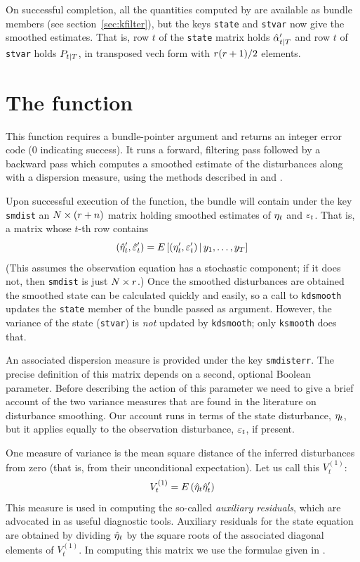 On successful completion, all the quantities computed by
 are available as bundle members (see
section~\ref{sec:kfilter}), but the keys \texttt{state} and
\texttt{stvar} now give the smoothed estimates.  That is, row $t$ of
the \texttt{state} matrix holds $\hat{\alpha}_{t|T}'$ and row $t$
of \texttt{stvar} holds $P_{t|T}$, in transposed vech form
with $r(r +1)/2$ elements.

\section{The  function}
\label{sec:kdsmooth}

This function requires a bundle-pointer argument and returns an
integer error code (0 indicating success).  It runs a forward,
filtering pass followed by a backward pass which computes a smoothed
estimate of the disturbances along with a dispersion measure, using
the methods described in \cite{koopman93} and \cite{koopman-etal99}.

Upon successful execution of the function, the bundle will contain
under the key \texttt{smdist} an $N \times (r + n)$ matrix
holding smoothed estimates of $\eta_t$ and $\varepsilon_t$. That is,
a matrix whose $t$-th row contains
\[
(\hat{\eta}_t' , \hat{\varepsilon}_t')
 = E\left[ (\eta_t' , \varepsilon_t') \,| \,
   y_1, \ldots, y_T \right]
\]
(This assumes the observation equation has a stochastic component; if
it does not, then \texttt{smdist} is just $N \times r$.) Once the
smoothed disturbances are obtained the smoothed state can be
calculated quickly and easily, so a call to \texttt{kdsmooth} updates
the \texttt{state} member of the bundle passed as argument. However,
the variance of the state (\texttt{stvar}) is \textit{not} updated by
\texttt{kdsmooth}; only \texttt{ksmooth} does that.

An associated dispersion measure is provided under the key
\texttt{smdisterr}. The precise definition of this matrix depends on a
second, optional Boolean parameter. Before describing the action of
this parameter we need to give a brief account of the two variance
measures that are found in the literature on disturbance
smoothing. Our account runs in terms of the state disturbance,
$\eta_t$, but it applies equally to the observation disturbance,
$\varepsilon_t$, if present.

One measure of variance is the mean square distance of the inferred
disturbances from zero (that is, from their unconditional
expectation). Let us call this $V^{(1)}_t$:
\[
V^{(1)}_t = E\left(\hat{\eta}_t\hat{\eta}_t'\right)
\]
This measure is used in computing the so-called \emph{auxiliary
  residuals}, which are advocated in \cite{durbin-koopman12} as useful
diagnostic tools. Auxiliary residuals for the state equation are
obtained by dividing $\hat{\eta}_t$ by the square roots of the
associated diagonal elements of $V^{(1)}_t$. In computing this matrix
we use the formulae given in \citet[section 4.4]{koopman-etal99}.

